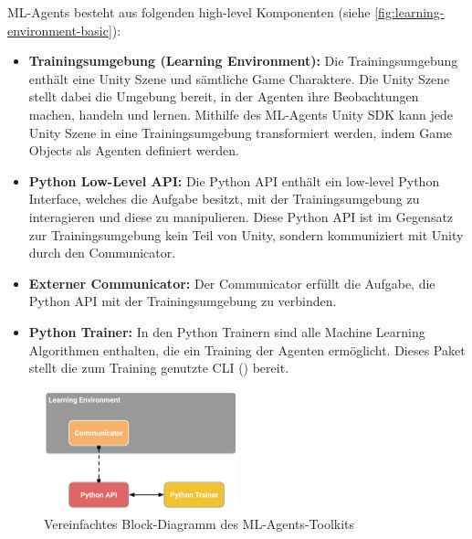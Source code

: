 ML-Agents besteht aus folgenden high-level Komponenten \cite{mlagentsOverview} (siehe \autoref{fig:learning-environment-basic}):
\begin{itemize}
    \item \textbf{Trainingsumgebung (Learning Environment):}
    Die Trainingsumgebung enthält eine Unity Szene und sämtliche Game Charaktere.
    Die Unity Szene stellt dabei die Umgebung bereit, in der Agenten ihre Beobachtungen machen, handeln und lernen.
    Mithilfe des ML-Agents Unity SDK kann jede Unity Szene in eine Trainingsumgebung transformiert werden, indem Game Objects als Agenten definiert werden.

    \item \textbf{Python Low-Level API:}
    Die Python API enthält ein low-level Python Interface, welches die Aufgabe besitzt, mit der Trainingsumgebung zu interagieren und diese zu manipulieren.
    Diese Python API ist im Gegensatz zur Trainingsumgebung kein Teil von Unity, sondern kommuniziert mit Unity durch den Communicator.

    \item \textbf{Externer Communicator:}
    Der Communicator erfüllt die Aufgabe, die Python API mit der Trainingsumgebung zu verbinden.

    \item \textbf{Python Trainer:}
    In den Python Trainern sind alle Machine Learning Algorithmen enthalten, die ein Training der Agenten ermöglicht.
    Dieses Paket stellt die zum Training genutzte CLI () bereit.
\end{itemize}

\begin{figure}
    \centering
    \includegraphics[width = 0.5\textwidth]{Bilder/ml-agents/learning_environment_basic.png}
    \caption{Vereinfachtes Block-Diagramm des ML-Agents-Toolkits \cite{mlagentsOverview}}
    \label{fig:learning-environment-basic}
\end{figure}


